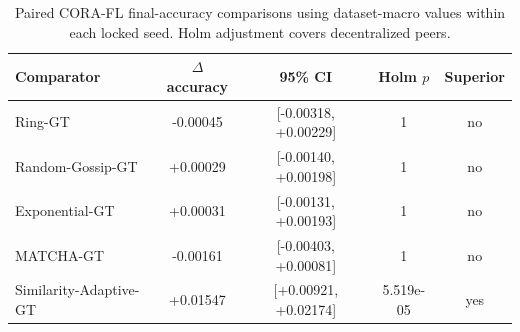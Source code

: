 \begin{table}[t]
\centering
\caption{Paired CORA-FL final-accuracy comparisons using dataset-macro values within each locked seed. Holm adjustment covers decentralized peers.}
\label{tab:confirmatory_inference}
\small
\begin{tabular}{lcccc}
\toprule
Comparator & $\Delta$ accuracy & 95\% CI & Holm $p$ & Superior \\
\midrule
Ring-GT & -0.00045 & [-0.00318, +0.00229] & 1 & no \\
Random-Gossip-GT & +0.00029 & [-0.00140, +0.00198] & 1 & no \\
Exponential-GT & +0.00031 & [-0.00131, +0.00193] & 1 & no \\
MATCHA-GT & -0.00161 & [-0.00403, +0.00081] & 1 & no \\
Similarity-Adaptive-GT & +0.01547 & [+0.00921, +0.02174] & 5.519e-05 & yes \\
\bottomrule
\end{tabular}
\end{table}
